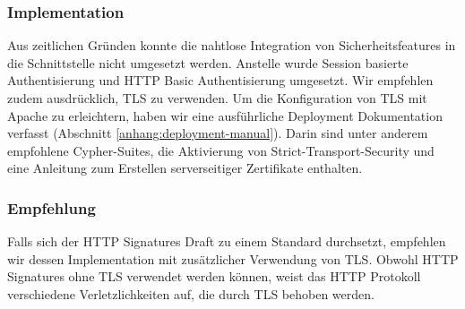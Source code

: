 \subsubsection{Implementation} Aus zeitlichen Gründen konnte die nahtlose
Integration von Sicherheitsfeatures in die Schnittstelle nicht umgesetzt werden.
Anstelle wurde Session basierte Authentisierung und HTTP Basic Authentisierung
umgesetzt. Wir empfehlen zudem ausdrücklich, TLS zu verwenden. Um die
Konfiguration von TLS mit Apache zu erleichtern, haben wir eine ausführliche
Deployment Dokumentation verfasst (Abschnitt \ref{anhang:deployment-manual}).
Darin sind unter anderem empfohlene Cypher-Suites, die Aktivierung von
Strict-Transport-Security und eine Anleitung zum Erstellen serverseitiger
Zertifikate enthalten.

\subsubsection{Empfehlung} Falls sich der HTTP Signatures Draft zu einem
Standard durchsetzt, empfehlen wir dessen Implementation mit zusätzlicher
Verwendung von TLS. Obwohl HTTP Signatures ohne TLS verwendet werden können,
weist das HTTP Protokoll verschiedene
Verletzlichkeiten\cite{httpsecconsiderations2014} auf, die durch TLS behoben
werden.
